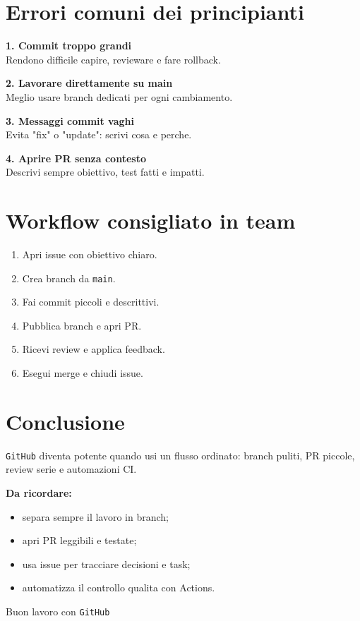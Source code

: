\documentclass[a4paper,11pt]{article}
\begin{document}
\section{Errori comuni dei principianti}
\begin{infobox}
\textbf{1. Commit troppo grandi} \\
Rendono difficile capire, revieware e fare rollback.

\medskip
\textbf{2. Lavorare direttamente su main} \\
Meglio usare branch dedicati per ogni cambiamento.

\medskip
\textbf{3. Messaggi commit vaghi} \\
Evita "fix" o "update": scrivi cosa e perche.

\medskip
\textbf{4. Aprire PR senza contesto} \\
Descrivi sempre obiettivo, test fatti e impatti.
\end{infobox}

\section{Workflow consigliato in team}
\begin{enumerate}[leftmargin=1.2cm]
    \item Apri issue con obiettivo chiaro.
    \item Crea branch da \texttt{main}.
    \item Fai commit piccoli e descrittivi.
    \item Pubblica branch e apri PR.
    \item Ricevi review e applica feedback.
    \item Esegui merge e chiudi issue.
\end{enumerate}

\section{Conclusione}
\texttt{GitHub} diventa potente quando usi un flusso ordinato: branch puliti, PR piccole, review serie e automazioni CI.

\begin{tipbox}
\textbf{Da ricordare:}
\begin{itemize}[leftmargin=1.2cm]
    \item separa sempre il lavoro in branch;
    \item apri PR leggibili e testate;
    \item usa issue per tracciare decisioni e task;
    \item automatizza il controllo qualita con Actions.
\end{itemize}
\end{tipbox}

\vfill
\begin{center}
\textcolor{AccentColor}{\large Buon lavoro con \texttt{GitHub}}
\end{center}
\end{document}
